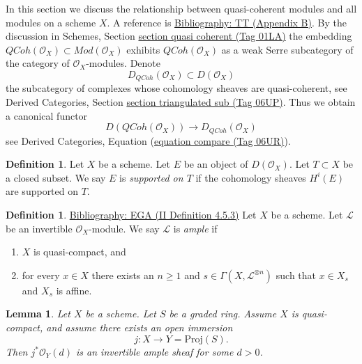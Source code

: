 \documentclass{amsart}
\newenvironment{reference}{\comment}{\endcomment}
\theoremstyle{plain}
\newtheorem{lemma}[subsection]{Lemma}
\theoremstyle{definition}
\newtheorem{definition}[subsection]{Definition}
\theoremstyle{remark}
\numberwithin{equation}{subsection}
\def\QCoh{\mathit{QCoh}}
\begin{document}
\noindent
In this section we discuss the relationship between quasi-coherent
modules and all modules on a scheme $X$. A reference is
\href{https://stacks.math.columbia.edu/bibliography}{Bibliography: TT (Appendix B)}. By the discussion in
Schemes, Section \href{https://stacks.math.columbia.edu/tag/01LA}{section quasi coherent (Tag 01LA)}
the embedding
$\QCoh(\mathcal{O}_X) \subset \textit{Mod}(\mathcal{O}_X)$
exhibits $\QCoh(\mathcal{O}_X)$ as a weak Serre subcategory of
the category of $\mathcal{O}_X$-modules. Denote
$$
D_\QCoh(\mathcal{O}_X) \subset D(\mathcal{O}_X)
$$
the subcategory of complexes whose cohomology sheaves are quasi-coherent, see
Derived Categories, Section \href{https://stacks.math.columbia.edu/tag/06UP}{section triangulated sub (Tag 06UP)}.
Thus we obtain a canonical functor
\begin{equation}
\label{equation-compare}
D(\QCoh(\mathcal{O}_X))
\longrightarrow
D_\QCoh(\mathcal{O}_X)
\end{equation}
see Derived Categories, Equation (\href{https://stacks.math.columbia.edu/tag/06UR}{equation compare (Tag 06UR)}).

\begin{definition}
\label{definition-supported-on}
Let $X$ be a scheme. Let $E$ be an object of $D(\mathcal{O}_X)$.
Let $T \subset X$ be a closed subset.
We say $E$ is {\it supported on $T$} if the
cohomology sheaves $H^i(E)$ are supported on $T$.
\end{definition}

\begin{definition}
\label{properties-definition-ample}
\begin{reference}
\href{https://stacks.math.columbia.edu/bibliography}{Bibliography: EGA (II Definition 4.5.3)}
\end{reference}
Let $X$ be a scheme.
Let $\mathcal{L}$ be an invertible $\mathcal{O}_X$-module.
We say $\mathcal{L}$ is {\it ample} if
\begin{enumerate}
\item $X$ is quasi-compact, and
\item for every $x \in X$ there exists an $n \geq 1$
and $s \in \Gamma(X, \mathcal{L}^{\otimes n})$ such
that $x \in X_s$ and $X_s$ is affine.
\end{enumerate}
\end{definition}

\begin{lemma}
\label{properties-lemma-open-in-proj-ample}
Let $X$ be a scheme.
Let $S$ be a graded ring. Assume $X$ is quasi-compact,
and assume there exists an open immersion
$$
j : X \longrightarrow Y = \text{Proj}(S).
$$
Then $j^*\mathcal{O}_Y(d)$ is an invertible ample sheaf
for some $d > 0$.
\end{lemma}
\end{document}
